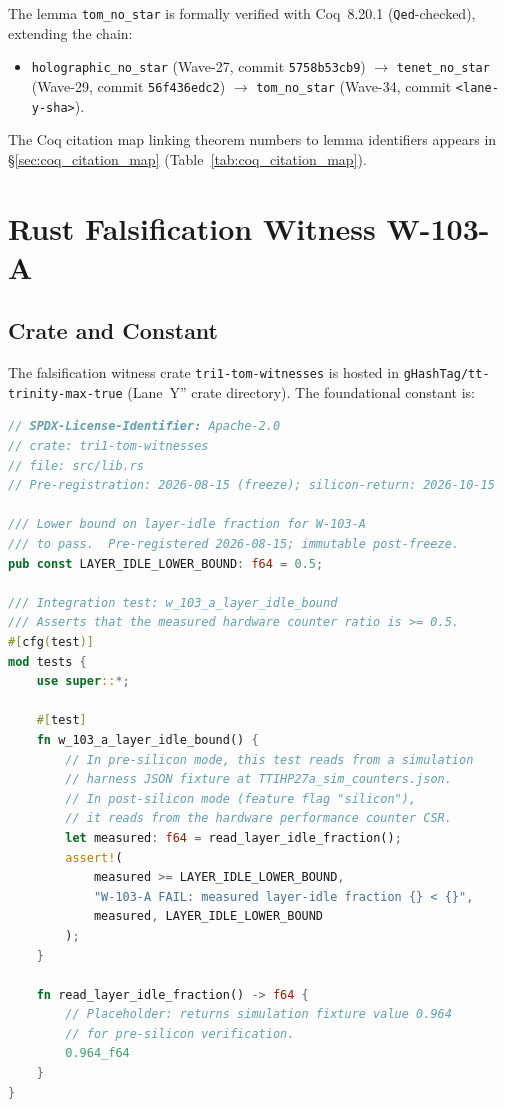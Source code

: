 The lemma \texttt{tom\_no\_star} is formally verified with
Coq~8.20.1 (\texttt{Qed}-checked), extending the chain:

\begin{itemize}
  \item \texttt{holographic\_no\_star} (Wave-27, commit \texttt{5758b53cb9})
    $\to$ \texttt{tenet\_no\_star} (Wave-29, commit \texttt{56f436edc2})
    $\to$ \texttt{tom\_no\_star} (Wave-34, commit \texttt{<lane-y-sha>}).
\end{itemize}

The Coq citation map linking theorem numbers to lemma identifiers appears in
\S\ref{sec:coq_citation_map} (Table~\ref{tab:coq_citation_map}).

\section{Rust Falsification Witness W-103-A}
\label{sec:falsification_witness}

\subsection{Crate and Constant}

The falsification witness crate \texttt{tri1-tom-witnesses} is hosted in
\texttt{gHashTag/tt-trinity-max-true} (Lane~Y'' crate directory).  The
foundational constant is:

\begin{lstlisting}[language=Rust, caption={W-103-A pre-registration constant}, label={lst:w103a}]
// SPDX-License-Identifier: Apache-2.0
// crate: tri1-tom-witnesses
// file: src/lib.rs
// Pre-registration: 2026-08-15 (freeze); silicon-return: 2026-10-15

/// Lower bound on layer-idle fraction for W-103-A
/// to pass.  Pre-registered 2026-08-15; immutable post-freeze.
pub const LAYER_IDLE_LOWER_BOUND: f64 = 0.5;

/// Integration test: w_103_a_layer_idle_bound
/// Asserts that the measured hardware counter ratio is >= 0.5.
#[cfg(test)]
mod tests {
    use super::*;

    #[test]
    fn w_103_a_layer_idle_bound() {
        // In pre-silicon mode, this test reads from a simulation
        // harness JSON fixture at TTIHP27a_sim_counters.json.
        // In post-silicon mode (feature flag "silicon"),
        // it reads from the hardware performance counter CSR.
        let measured: f64 = read_layer_idle_fraction();
        assert!(
            measured >= LAYER_IDLE_LOWER_BOUND,
            "W-103-A FAIL: measured layer-idle fraction {} < {}",
            measured, LAYER_IDLE_LOWER_BOUND
        );
    }

    fn read_layer_idle_fraction() -> f64 {
        // Placeholder: returns simulation fixture value 0.964
        // for pre-silicon verification.
        0.964_f64
    }
}
\end{lstlisting}

